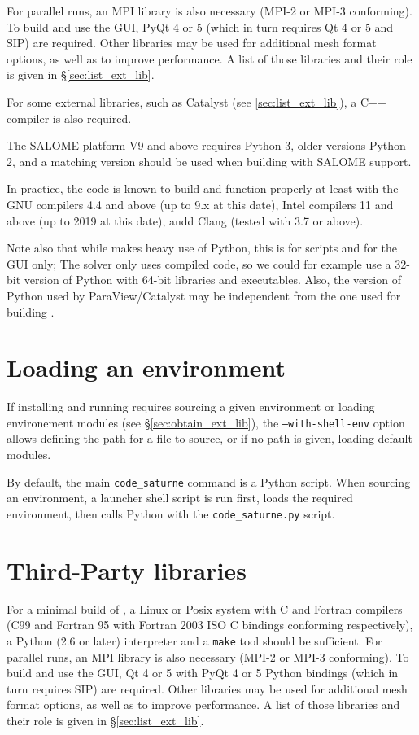 \documentclass[a4paper,10pt,twoside]{csshortdoc}
\begin{document}
For parallel runs, an MPI library is also necessary (MPI-2 or MPI-3 conforming).
To build and use the GUI, PyQt 4 or 5 (which in turn requires
Qt 4 or 5 and SIP) are required.
Other libraries may be used for additional mesh format options,
as well as to improve performance. A list of those libraries
and their role is given in \S\ref{sec:list_ext_lib}.

For some external libraries, such as Catalyst (see \ref{sec:list_ext_lib}),
a C++ compiler is also required.

The SALOME platform V9 and above requires Python 3, older versions Python 2,
and a matching version should be used when building with SALOME support.

In practice, the code is known to build and function properly at least with the
GNU compilers 4.4 and above (up to 9.x at this date), Intel compilers 11 and
above (up to 2019 at this date), andd Clang (tested with 3.7 or above).

Note also that while \CS makes heavy use of Python, this is for scripts and
for the GUI only; The solver only uses compiled code, so we could for example use
a 32-bit version of Python with 64-bit \CS libraries and executables.
Also, the version of Python used by ParaView/Catalyst may be independent
from the one used for building \CS.

\section{Loading an environment\label{sec:shell_env}}

If installing and running \CS requires sourcing a given environment
or loading environement modules (see \S\ref{sec:obtain_ext_lib}),
the \texttt{--with-shell-env} option allows defining the path for a file
to source, or if no path is given, loading default modules.

By default, the main \texttt{code\_saturne} command is a Python
script. When sourcing an environment, a launcher shell script is
run first, loads the required environment, then calls Python with the
\texttt{code\_saturne.py} script.

\section{Third-Party libraries\label{sec:ext_lib}}

For a minimal build of \CS, a Linux or Posix system with C and Fortran compilers
(C99 and Fortran 95 with Fortran 2003 ISO C bindings conforming respectively),
a Python (2.6 or later) interpreter and a {\tt make} tool should be sufficient.
For parallel runs, an MPI library is also necessary (MPI-2 or MPI-3 conforming).
To build and use the GUI, Qt 4 or 5 with PyQt 4 or 5 Python bindings
(which in turn requires SIP) are required.
Other libraries may be used for additional mesh format options,
as well as to improve performance. A list of those libraries
and their role is given in \S\ref{sec:list_ext_lib}.
\end{document}
